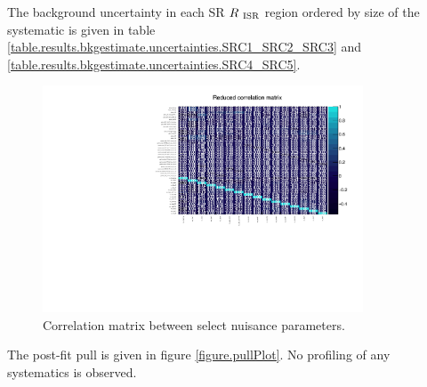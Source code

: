 \indent The background uncertainty in each SR $R_{~\mathrm{ISR}}$ region ordered by size of the systematic is given in table \ref{table.results.bkgestimate.uncertainties.SRC1_SRC2_SRC3} and \ref{table.results.bkgestimate.uncertainties.SRC4_SRC5}.  \\





\begin{figure}
	\begin{center}
		\includegraphics[width=0.85\textwidth, angle=90]{HistFitterStuff/corrMatrix.pdf}
		\caption{Correlation matrix between select nuisance parameters.}
		\label{figure.corrMatrix}
	\end{center}
\end{figure}

\indent The post-fit pull is given in figure \ref{figure.pullPlot}.  No profiling of any systematics is observed. \\

